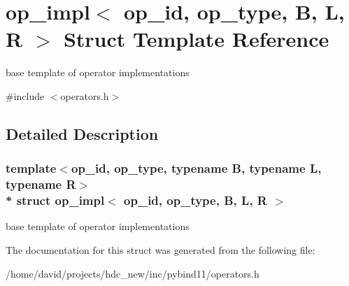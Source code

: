 \hypertarget{structop__impl}{}\section{op\+\_\+impl$<$ op\+\_\+id, op\+\_\+type, B, L, R $>$ Struct Template Reference}
\label{structop__impl}


base template of operator implementations  




{\ttfamily \#include $<$operators.\+h$>$}



\subsection{Detailed Description}
\subsubsection*{template$<$op\+\_\+id, op\+\_\+type, typename B, typename L, typename R$>$\\*
struct op\+\_\+impl$<$ op\+\_\+id, op\+\_\+type, B, L, R $>$}

base template of operator implementations 

The documentation for this struct was generated from the following file\+:\begin{DoxyCompactItemize}
\item 
/home/david/projects/hdc\+\_\+new/inc/pybind11/operators.\+h\end{DoxyCompactItemize}
